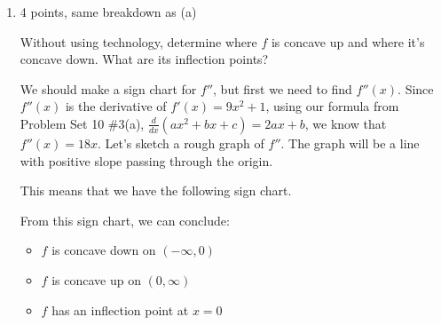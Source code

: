\documentclass{article}
\begin{document}
\begin{enumerate}
\begin{enumerate}
\begin{solution}
    \end{solution}

  \item \label{3x^3+x-concavity}

    \begin{grading}
      4 points, same breakdown as (a)
    \end{grading}

    \begin{problem}[\vfill]
      Without using technology, determine where $f$ is concave up and where it's concave down. What are its inflection points?
    \end{problem}

    \begin{solution}
      We should make a sign chart for $f''$, but first we need to find $f''(x)$. Since $f''(x)$ is the derivative
      of $f'(x)=9x^2+1$, using our formula from
      Problem Set 10 \#3(a), $\frac{d}{dx}(ax^2+bx+c)=2ax+b$, we know that $f''(x)=18x$.
      Let's sketch a rough graph of $f''$. The graph
      will be a line with positive slope passing through the origin.

      \begin{center}
      \end{center}

      This means that we have the following sign chart.

      \begin{center}
      \end{center}
      From this sign chart, we can conclude:
      \begin{itemize}
        \item $f$ is concave down on $(-\infty, 0)$
        \item $f$ is concave up on $(0, \infty)$
        \item $f$ has an inflection point at $x=0$
      \end{itemize}
      

\end{solution}
\end{enumerate}
\end{enumerate}
\end{document}
